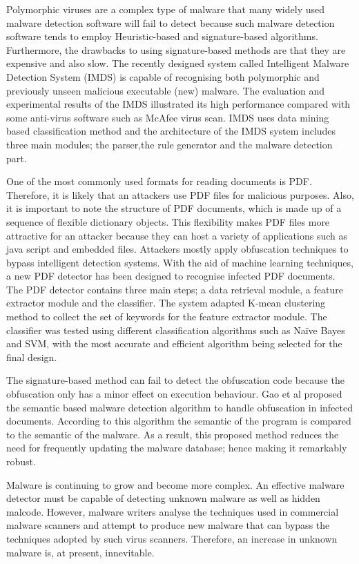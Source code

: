 Polymorphic viruses are a complex type of malware that many widely used malware
detection software will fail to detect because such malware detection software
tends to employ Heuristic-based and signature-based algorithms. Furthermore, the
drawbacks to using signature-based methods are that they are expensive and also
slow.  The recently designed system called Intelligent Malware Detection System
(IMDS) is capable of recognising both polymorphic and previously unseen
malicious executable (new) malware. The evaluation and experimental results of the IMDS illustrated its high performance compared with some anti-virus software such as McAfee virus scan. IMDS uses data mining based classification method and the architecture of the IMDS system includes three main modules; the parser,the rule generator and the malware detection part\cite{IMDS}.

One of the most commonly used formats for reading documents is PDF. Therefore,
it is likely that an attackers use PDF files for malicious purposes. Also, it
is important to note the structure of PDF documents, which is made up of a
sequence of flexible dictionary objects. This flexibility makes PDF files more
attractive for an attacker because they can host a variety of applications such
as java script and embedded files. Attackers mostly apply obfuscation
techniques to bypass intelligent detection systems. With the aid of machine
learning techniques, a new PDF detector has been designed to recognise infected
PDF documents\cite{maiorca2012pattern}.  The PDF detector contains three main
steps; a data retrieval module, a feature extractor module and the classifier.
The system adapted K-mean clustering method to collect the set of keywords for
the feature extractor module. The classifier was tested using different
classification algorithms such as Naïve Bayes and SVM, with the most accurate
and efficient algorithm being selected for the final
design\cite{maiorca2012pattern}.
 
The signature-based method can fail to detect the obfuscation code because the
obfuscation only has a minor effect on execution behaviour. Gao et al proposed
the semantic based malware detection algorithm to handle obfuscation in
infected documents. According to this algorithm the semantic of the program is
compared to the semantic of the malware. As a result, this proposed method
reduces the need for frequently updating the malware database; hence making it
remarkably robust\cite{Amom}. 


Malware is continuing to grow and become more complex. An effective malware
detector must be capable of detecting unknown malware as well as hidden
malcode. However, malware writers analyse the techniques used in commercial
malware scanners and attempt to produce new malware that can bypass the
techniques adopted by such virus scanners. Therefore, an increase in unknown
malware is, at present, innevitable\cite{vinod2009survey}.


